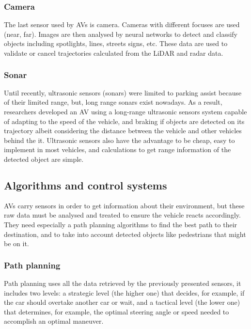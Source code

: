 \subsubsection{Camera}

The last sensor used by AVs is camera. Cameras with different focuses are used (near, far). Images are then analysed by neural networks to detect and classify objects including spotlights, lines, streets signs, etc. These data are used to validate or cancel trajectories calculated from the LiDAR and radar data.

\subsubsection{Sonar}

Until recently, ultrasonic sensors (sonars) were limited to parking assist because of their limited range, but, long range sonars exist nowadays. As a result, researchers developed an AV using a long-range ultrasonic sensors system\cite{budisusila_review_2019} capable of adapting to the speed of the vehicle, and braking if objects are detected on its trajectory albeit considering the distance between the vehicle and other vehicles behind the it. Ultrasonic sensors also have the advantage to be cheap, easy to implement in most vehicles, and calculations to get range information of the detected object are simple.

\subsection{Algorithms and control systems}

AVs carry sensors in order to get information about their environment, but these raw data must be analysed and treated to ensure the vehicle reacts accordingly. They need especially a path planning algorithms to find the best path to their destination, and to take into account detected objects like pedestrians that might be on it.

\subsubsection{Path planning}

Path planning uses all the data retrieved by the previously presented sensors, it includes two levels: a strategic level (the higher one) that decides, for example, if the car should overtake another car or wait, and a tactical level (the lower one) that determines, for example, the optimal steering angle or speed needed to accomplish an optimal maneuver.
\smallskip

